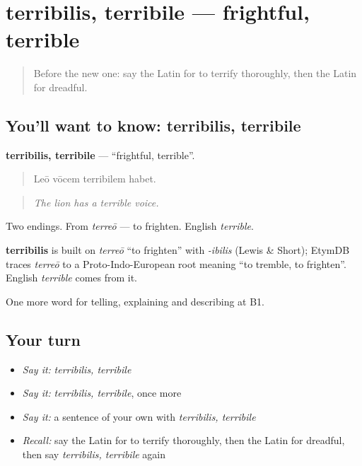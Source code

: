 \section[terribilis, terribile]{terribilis, terribile — frightful, terrible}

\label{lesson:LA-C496-terribilis}



\begin{quote}
Before the new one: say the Latin for to terrify thoroughly, then the Latin for dreadful.
\end{quote}

\subsection*{You'll want to know: terribilis, terribile}
\textbf{terribilis, terribile} — \textquotedblleft{}frightful, terrible\textquotedblright{}.

\begin{quote}
Leō vōcem terribilem habet.
\end{quote}

\begin{quote}
\emph{The lion has a terrible voice.}
\end{quote}

Two endings. From \emph{terreō} — to frighten. English \emph{terrible}.

\begin{cousinweb}
\textbf{terribilis} is built on \emph{terreō} \textquotedblleft{}to frighten\textquotedblright{} with \emph{-ibilis} (Lewis \& Short); EtymDB traces \emph{terreō} to a Proto-Indo-European root meaning \textquotedblleft{}to tremble, to frighten\textquotedblright{}. English \emph{terrible} comes from it.
\end{cousinweb}

\begin{grammarlens}[title={What you've built}]
One more word for telling, explaining and describing at B1.
\end{grammarlens}

\subsection*{Your turn}
\begin{itemize}
\raggedright
  \item \emph{Say it:} \emph{terribilis, terribile}
  \item \emph{Say it:} \emph{terribilis, terribile}, once more
  \item \emph{Say it:} a sentence of your own with \emph{terribilis, terribile}
  \item \emph{Recall:} say the Latin for to terrify thoroughly, then the Latin for dreadful, then say \emph{terribilis, terribile} again
\end{itemize}

